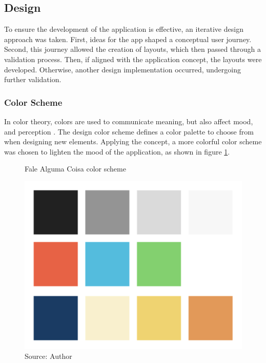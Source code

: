 \subsection{Design}

To ensure the development of the application is effective, an iterative design approach was taken. First, ideas for the app shaped a conceptual user journey. Second, this journey allowed the creation of layouts, which then passed through a validation process. Then, if aligned with the application concept, the layouts were developed. Otherwise, another design implementation occurred, undergoing further validation.

\subsubsection{Color Scheme}

In color theory, colors are used to communicate meaning, but also affect mood, and perception \cite{agoston2013color}. The design color scheme defines a color palette to choose from when designing new elements. Applying the concept, a more colorful color scheme was chosen to lighten the mood of the application, as shown in figure \ref{fig:falealgumacoisa-color-scheme}.

\begin{figure}[ht]
    \centering
    \caption{Fale Alguma Coisa color scheme}
    \includegraphics[width=\linewidth/2]{images/app/colors.png}
    \caption*{Source: Author}
    \label{fig:falealgumacoisa-color-scheme}
\end{figure}

